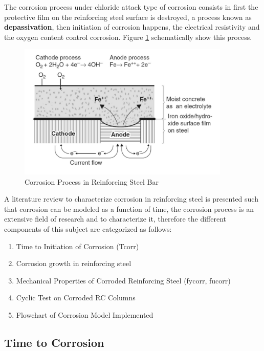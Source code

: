 The corrosion process under chloride attack type of corrosion consists in first the protective film  on the reinforcing steel surface is destroyed, a process known as \textbf{depassivation}, then initiation of corrosion happens, the electrical resistivity and the oxygen content control corrosion. Figure \ref{fig:corr1} schematically show this process.

\begin{figure}[htbp]
\centering
\includegraphics[width=0.9\textwidth]{Chapter-2/figs/Corrosion_Process}
\caption{Corrosion Process in Reinforcing Steel Bar \cite{Mehta2014}}
\label{fig:corr1}
\end{figure}


A literature review to characterize corrosion in reinforcing steel is presented such that corrosion can be modeled as a function of time, the corrosion process is an extensive field of research and to characterize it, therefore the different components of this subject are categorized as follows:

\begin{enumerate}
	\item Time to Initiation of Corrosion (Tcorr)
	\item Corrosion growth in reinforcing steel
	\item Mechanical Properties of Corroded Reinforcing Steel (fycorr, fucorr)
	\item Cyclic Test on Corroded RC Columns
	\item Flowchart of Corrosion Model Implemented
\end{enumerate}

 
\subsection{Time to Corrosion}

